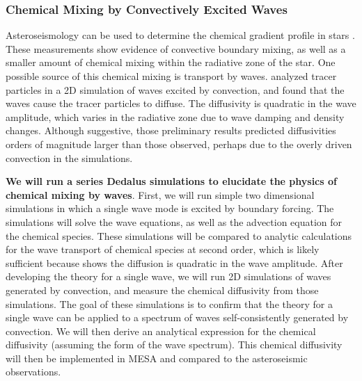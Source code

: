 \subsubsection{Chemical Mixing by Convectively Excited Waves}

Asteroseismology can be used to determine the chemical gradient profile in stars \citep{moravveji:15,moravveji:16,Ghasemi_2016}. These measurements show evidence of convective boundary mixing, as well as a smaller amount of chemical mixing within the radiative zone of the star. One possible source of this chemical mixing is transport by waves. \citet{Rogers2017} analyzed tracer particles in a 2D simulation of waves excited by convection, and found that the waves cause the tracer particles to diffuse. The diffusivity is quadratic in the wave amplitude, which varies in the radiative zone due to wave damping and density changes. Although suggestive, those preliminary results predicted diffusivities orders of magnitude larger than those observed, perhaps due to the overly driven convection in the simulations. 

\textbf{We will run a series Dedalus simulations to elucidate the physics of chemical mixing by waves}. First, we will run simple two dimensional simulations in which a single wave mode is excited by boundary forcing. The simulations will solve the wave equations, as well as the advection equation for the chemical species. These simulations will be compared to analytic calculations for the wave transport of chemical species at second order, which is likely sufficient because \citet{Rogers2017} shows the diffusion is quadratic in the wave amplitude. After developing the theory for a single wave, we will run 2D simulations of waves generated by convection, and measure the chemical diffusivity from those simulations. The goal of these simulations is to confirm that the theory for a single wave can be applied to a spectrum of waves self-consistently generated by convection. We will then derive an analytical expression for the chemical diffusivity (assuming the form of the wave spectrum). This chemical diffusivity will then be implemented in MESA and compared to the asteroseismic observations.
